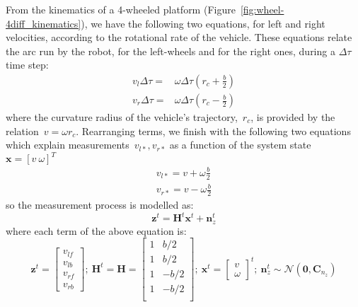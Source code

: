 From the kinematics of a 4-wheeled platform (Figure~\ref{fig:wheel-4diff_kinematics}), we have the following two equations, for left and right velocities, according to the rotational rate of the vehicle. These equations relate the arc run by the robot, for the left-wheels and for the right ones, during a $\Delta\tau$ time step:
\begin{equation}
\begin{array}{cc}
 v_l\Delta\tau = & \omega\Delta\tau(r_c+\frac{b}{2}) \\
 v_r\Delta\tau = & \omega\Delta\tau(r_c-\frac{b}{2}) 
\end{array}
\label{eq:v_l_v_r}
\end{equation}
where the curvature radius of the vehicle's trajectory,~$r_c$, is provided by the relation~$v=\omega r_c$. Rearranging terms, we finish with the following two equations which explain measurements~$v_{l*},v_{r*}$ as a function of the system state~$\mathbf{x}=[v\ \omega]^T$
\begin{equation}
\begin{array}{cc}
 v_{l*} = v+\omega\frac{b}{2} \\
 v_{r*} = v-\omega\frac{b}{2}
\end{array}
\end{equation}
so the measurement process is modelled as:
\begin{equation}
 \mathbf{z}^t = \mathbf{H}^t\mathbf{x}^t + \mathbf{n}^t_z 
\end{equation}
where each term of the above equation is:
\begin{equation}
 \mathbf{z}^t =
 \left[
 \begin{array}{c}
  v_{lf}\\
  v_{lb}\\
  v_{rf}\\
  v_{rb}
 \end{array}
 \right]; \ 
 \mathbf{H}^t = \mathbf{H} = 
 \left[
 \begin{array}{cc}
  1 & b/2 \\
  1 & b/2 \\
  1 & -b/2 \\
  1 & -b/2 \\
 \end{array}
 \right];\ 
 \mathbf{x}^t=
 \left[
 \begin{array}{c}
  v\\
  \omega
 \end{array}
 \right]^t;\ 
 \mathbf{n}^t_z \sim \mathcal{N}(\mathbf{0},\mathbf{C}_{n_z})
\end{equation}
